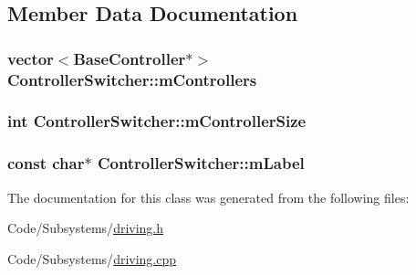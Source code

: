 \subsection{\-Member \-Data \-Documentation}
\hypertarget{class_controller_switcher_a14fc6d608b0d3b913ba4d4cac3b67f5c}{
\subsubsection[{m\-Controllers}]{\setlength{\rightskip}{0pt plus 5cm}vector$<${\bf \-Base\-Controller}$\ast$$>$ {\bf \-Controller\-Switcher\-::m\-Controllers}}}\label{class_controller_switcher_a14fc6d608b0d3b913ba4d4cac3b67f5c}
\hypertarget{class_controller_switcher_a1164e2c738ef79e459880bdb66e2f7f9}{
\subsubsection[{m\-Controller\-Size}]{\setlength{\rightskip}{0pt plus 5cm}int {\bf \-Controller\-Switcher\-::m\-Controller\-Size}}}\label{class_controller_switcher_a1164e2c738ef79e459880bdb66e2f7f9}
\hypertarget{class_controller_switcher_a9c56a431ba8c92a669972199e072306a}{
\subsubsection[{m\-Label}]{\setlength{\rightskip}{0pt plus 5cm}const char$\ast$ {\bf \-Controller\-Switcher\-::m\-Label}}}\label{class_controller_switcher_a9c56a431ba8c92a669972199e072306a}


\-The documentation for this class was generated from the following files\-:\begin{DoxyCompactItemize}
\item 
\-Code/\-Subsystems/\hyperlink{driving_8h}{driving.\-h}\item 
\-Code/\-Subsystems/\hyperlink{driving_8cpp}{driving.\-cpp}\end{DoxyCompactItemize}
